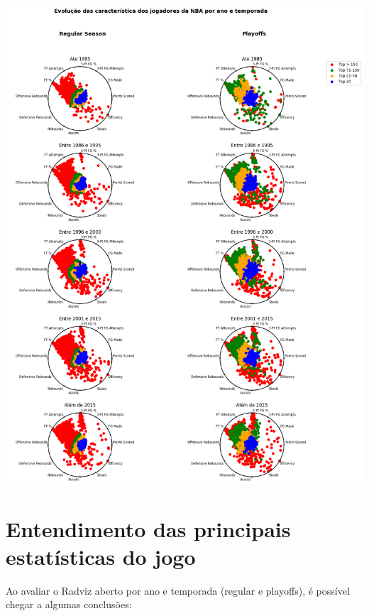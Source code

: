 \documentclass[
]{book}
\begin{document}
\includegraphics{imagens/14.png}

\hypertarget{entendimento-das-principais-estatuxedsticas-do-jogo}{%
\chapter{Entendimento das principais estatísticas do jogo}\label{entendimento-das-principais-estatuxedsticas-do-jogo}}

Ao avaliar o Radviz aberto por ano e temporada (regular e playoffs), é possível chegar a algumas conclusões:
\end{document}
